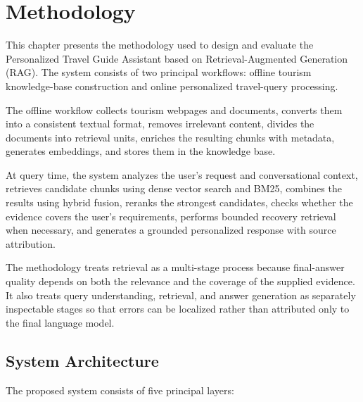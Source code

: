 \chapter{Methodology}
\label{chap:methodology}

This chapter presents the methodology used to design and evaluate the
Personalized Travel Guide Assistant based on Retrieval-Augmented Generation
(RAG). The system consists of two principal workflows: offline tourism
knowledge-base construction and online personalized travel-query processing.

The offline workflow collects tourism webpages and documents, converts them
into a consistent textual format, removes irrelevant content, divides the
documents into retrieval units, enriches the resulting chunks with metadata,
generates embeddings, and stores them in the knowledge base.

At query time, the system analyzes the user's request and conversational
context, retrieves candidate chunks using dense vector search and BM25,
combines the results using hybrid fusion, reranks the strongest candidates,
checks whether the evidence covers the user's requirements, performs bounded
recovery retrieval when necessary, and generates a grounded personalized
response with source attribution.

The methodology treats retrieval as a multi-stage process because final-answer
quality depends on both the relevance and the coverage of the supplied
evidence. It also treats query understanding, retrieval, and answer generation
as separately inspectable stages so that errors can be localized rather than
attributed only to the final language model.

\section{System Architecture}

The proposed system consists of five principal layers:

